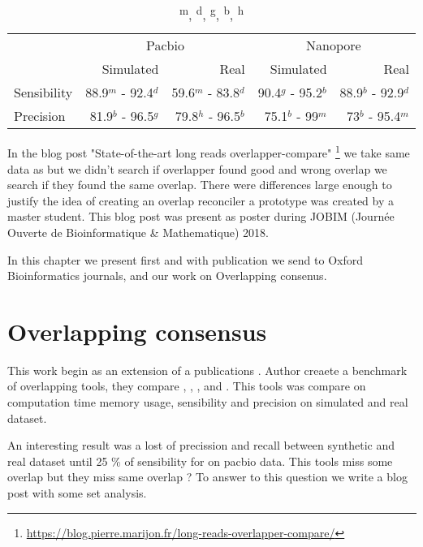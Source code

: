 \documentclass[main.tex]{subfiles}
\begin{document}
\begin{table}[ht]
    \centering
    \begin{tabular}{l|rr|rr}
                & \multicolumn{2}{c}{Pacbio}                & \multicolumn{2}{c}{Nanopore}              \\ 
                & Simulated           & Real                & Simulated         & Real                  \\ \hline
    Sensibility & 88.9$^m$ - 92.4$^d$ & 59.6$^m$ - 83.8$^d$ & 90.4$^g$ - 95.2$^b$ & 88.9$^b$ - 92.9$^d$ \\
    Precision   & 81.9$^b$ - 96.5$^g$ & 79.8$^h$ - 96.5$^b$ & 75.1$^b$ - 99$^m$   & 73$^b$ - 95.4$^m$   \\
    \end{tabular}
    \caption{\textsuperscript{m}, \textsuperscript{d}, \textsuperscript{g}, \textsuperscript{b}, \textsuperscript{h}\mhap}
    \label{preassembly:tab:ovl_result}
\end{table}

In the blog post "State-of-the-art long reads overlapper-compare" \footnote{\url{https://blog.pierre.marijon.fr/long-reads-overlapper-compare/}} we take same data as \cite{ovl_bench} but we didn't search if overlapper found good and wrong overlap we search if they found the same overlap. There were differences large enough to justify the idea of creating an overlap reconciler a prototype was created by a master student. 
This blog post was present as poster during JOBIM (Journée Ouverte de Bioinformatique \& Mathematique) 2018.


In this chapter we present first \yacrd and \fpa with publication we send to Oxford Bioinformatics journals, and our work on Overlapping consenus.



%


\section{Overlapping consensus}\label{section:preassembly:ovl_consensus}

This work begin as an extension of a \citeauthor{bench_ovl} publications \cite{bench_ovl}. Author creaete a benchmark of overlapping tools, they compare \mhap, \minimap, \cite{blasr}, \cite{daligner} and \cite{graphmap}. This tools was compare on computation time memory usage, sensibility and precision on simulated and real dataset.

An interesting result was a lost of precission and recall between synthetic and real dataset until 25 \% of sensibility for  on pacbio data. This tools miss some overlap but they miss same overlap ? To answer to this question we write a blog post with some set analysis.




\end{document}
